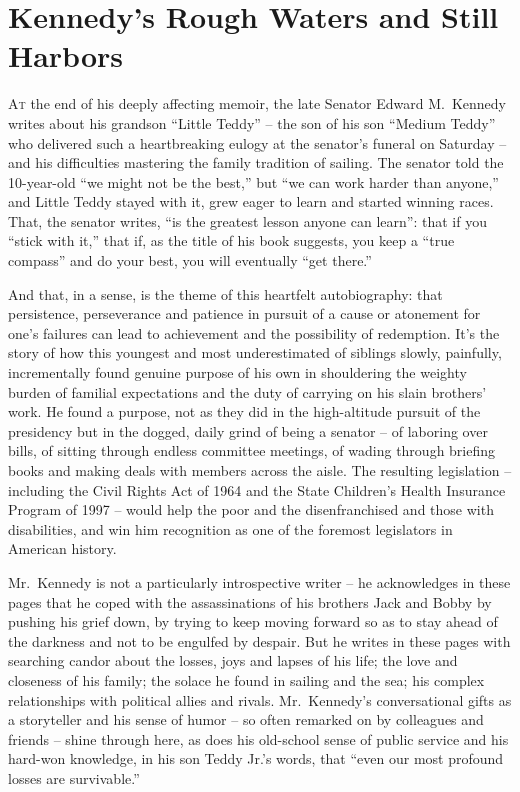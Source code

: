 ﻿\documentclass[12pt]{article}
\begin{document}
\section{Kennedy's Rough Waters and Still Harbors}

\lettrine{A}{t} the end of his deeply affecting memoir, the late Senator Edward M.~Kennedy writes
about his grandson ``Little Teddy'' -- the son of his son ``Medium Teddy'' who delivered such a
heartbreaking eulogy\cite{eulogy} at the senator's funeral on Saturday -- and his difficulties
mastering the family tradition of sailing. The senator told the 10-year-old ``we might not be the
best,'' but ``we can work harder than anyone,'' and Little Teddy stayed with it, grew eager to learn
and started winning races. That, the senator writes, ``is the greatest lesson anyone can learn'':
that if you ``stick with it,'' that if, as the title of his book suggests, you keep a ``true
compass'' and do your best, you will eventually ``get there.''

And that, in a sense, is the theme of this heartfelt autobiography: that persistence, perseverance
and patience in pursuit of a cause or atonement\cite{atonement} for one's failures can lead to
achievement and the possibility of redemption. It's the story of how this youngest and most
underestimated of siblings slowly, painfully, incrementally found genuine purpose of his own in
shouldering the weighty burden of familial expectations and the duty of carrying on his slain
brothers' work. He found a purpose, not as they did in the high-altitude pursuit of the presidency
but in the dogged, daily grind of being a senator -- of laboring over bills, of sitting through
endless committee meetings, of wading through briefing books and making deals with members across
the aisle. The resulting legislation -- including the Civil Rights Act of 1964 and the State
Children's Health Insurance Program of 1997 -- would help the poor and the disenfranchised and those
with disabilities, and win him recognition as one of the foremost legislators in American history.

Mr.~Kennedy is not a particularly introspective writer -- he acknowledges in these pages that he
coped with the assassinations of his brothers Jack and Bobby by pushing his grief down, by trying to
keep moving forward so as to stay ahead of the darkness and not to be engulfed by despair. But he
writes in these pages with searching candor\cite{candor} about the losses, joys and lapses of his
life; the love and closeness of his family; the solace he found in sailing and the sea; his complex
relationships with political allies and rivals. Mr.~Kennedy's conversational gifts as a storyteller
and his sense of humor -- so often remarked on by colleagues and friends -- shine through here, as
does his old-school sense of public service and his hard-won knowledge, in his son Teddy Jr.'s
words, that ``even our most profound losses are survivable.''
\end{document}

